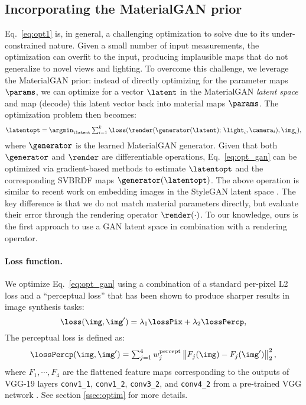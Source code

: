 \subsection{Incorporating the MaterialGAN prior}
%
Eq.~\eqref{eq:opt1} is, in general, a challenging optimization to solve due to its under-constrained nature.
Given a small number of input measurements, the optimization can overfit to the input, producing implausible maps that do not generalize to novel views and lighting.
To overcome this challenge, we leverage the MaterialGAN prior: instead of directly optimizing for the parameter maps~$\params$,  we can optimize for a vector $\latent$ in the MaterialGAN \emph{latent space} and map (decode) this latent vector back into material maps $\params$.
The optimization problem then becomes:
%
\begin{equation}
	\label{eq:opt_gan}
	\latentopt = \textstyle\argmin_{\latent} \sum_{i=1}^k \loss(\render(\generator(\latent); \,\light_i, \camera_i), \img_i),
\end{equation}
%
where $\generator$ is the learned MaterialGAN generator.
Given that both $\generator$ and $\render$ are differentiable operations, Eq.~\eqref{eq:opt_gan} can be optimized via gradient-based methods to estimate $\latentopt$ and the corresponding SVBRDF maps $\generator(\latentopt)$.
%
The above operation is similar to recent work on embedding images in the StyleGAN latent space \cite{Abdal19a,Abdal19b}.
The key difference is that we do not match material parameters directly, but evaluate their error through the rendering operator $\render(\cdot)$.
To our knowledge, ours is the first approach to use a GAN latent space in combination with a rendering operator.
%
\paragraph{Loss function.}
We optimize Eq.~\ref{eq:opt_gan} using a combination of a standard per-pixel L2 loss and a ``perceptual loss'' \cite{Johnson2016} that has been shown to produce sharper results in image synthesis tasks:
%
\begin{equation}
	\label{eq:loss}
	\loss(\img, \img') = \lambda_1 \lossPix + \lambda_2 \lossPercp,
\end{equation}
%
The perceptual loss is defined as:
%
\begin{equation}
	\lossPercp(\img, \img') = \textstyle\sum_{j=1}^4 w^\mathrm{percept}_j \left\|F_j(\img) - F_j(\img')\right\|_2^2,
\end{equation}
%
where $F_1, \cdots, F_4$ are the flattened feature maps corresponding to the outputs of VGG-19 layers  \texttt{conv1\_1}, \texttt{conv1\_2}, \texttt{conv3\_2}, and \texttt{conv4\_2} from a pre-trained VGG network \cite{VGG}. See section \ref{ssec:optim} for more details.
%
